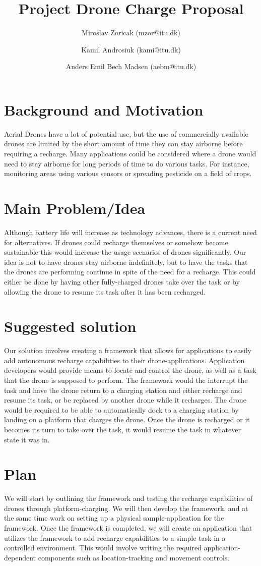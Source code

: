 \documentclass[11pt]{article} %
\title{Project Drone Charge Proposal}
\author{Miroslav Zoricak (mzor@itu.dk) \and Kamil Androsiuk (kami@itu.dk) \and Anders Emil Bech Madsen (aebm@itu.dk)}
\begin{document}
\maketitle

\section{Background and Motivation}
Aerial Drones have a lot of potential use, but the use of commercially available drones are limited by the short amount of time they can stay airborne before requiring a recharge. Many applications could be considered where a drone would need to stay airborne for long periods of time to do various tasks. For instance, monitoring areas using various sensors or spreading pesticide on a field of crops.

\section{Main Problem/Idea}
Although battery life will increase as technology advances, there is a current need for alternatives. If drones could recharge themselves or somehow become sustainable this would increase the usage scenarios of drones significantly. Our idea is not to have drones stay airborne indefinitely, but to have the tasks that the drones are performing continue in spite of the need for a recharge. This could either be done by having other fully-charged drones take over the task or by allowing the drone to resume its task after it has been recharged.

\section{Suggested solution}
Our solution involves creating a framework that allows for applications to easily add autonomous recharge capabilities to their drone-applications. Application developers would provide means to locate and control the drone, as well as a task that the drone is supposed to perform. The framework would the interrupt the task and have the drone return to a charging station and either recharge and resume its task, or be replaced by another drone while it recharges. The drone would be required to be able to automatically dock to a charging station by landing on a platform that charges the drone. Once the drone is recharged or it becomes its turn to take over the task, it would resume the task in whatever state it was in.

\section{Plan}
We will start by outlining the framework and testing the recharge capabilities of drones through platform-charging. We will then develop the framework, and at the same time work on setting up a physical sample-application for the framework. Once the framework is completed, we will create an application that utilizes the framework to add recharge capabilities to a simple task in a controlled environment. This would involve writing the required application-dependent components such as location-tracking and movement controls.
\end{document}
